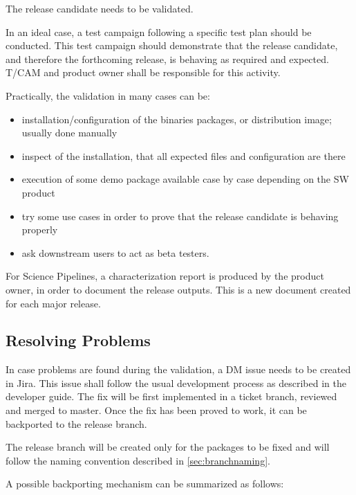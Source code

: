 The release candidate needs to be validated.

In an ideal case, a test campaign following a specific test plan should be conducted.
This test campaign should demonstrate that the release candidate, and therefore the forthcoming release, is behaving as required and expected.
T/CAM and product owner shall be responsible for this activity.

Practically, the validation in many cases can be:

\begin{itemize}
\item installation/configuration of the binaries packages, or distribution image; usually done manually
\item inspect of the installation, that all expected files and configuration are there
\item execution of some demo package available case by case depending on the SW product
\item try some use cases in order to prove that the release candidate is behaving properly
\item ask downstream users to act as beta testers.
\end{itemize}

For Science Pipelines, a characterization report is produced by the product owner, in order to document the release outputs.
This is a new document created for each major release.


\subsection{Resolving Problems}

In case problems are found during the validation, a DM issue needs to be created in Jira.
This issue shall follow the usual development process as described in the developer guide.
The fix will be first implemented in a ticket branch, reviewed and merged to master.
Once the fix has been proved to work, it can be backported to the release branch.

The release branch will be created only for the packages to be fixed and will follow the naming convention described in \ref{sec:branchnaming}.

A possible backporting mechanism can be summarized as follows:

